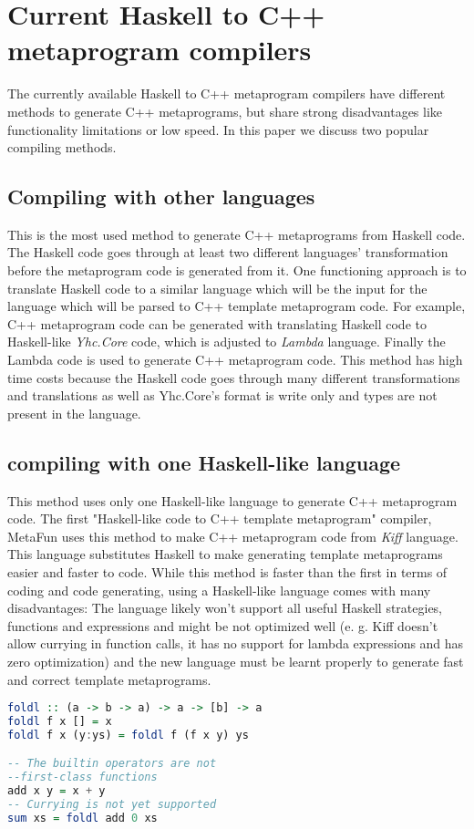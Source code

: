 \documentclass{article}
\begin{document}
\section{Current Haskell to C++ metaprogram compilers}
The currently available Haskell to C++ metaprogram compilers have different methods to generate C++ metaprograms, but share strong disadvantages like functionality limitations or low speed. In this paper we discuss two popular compiling methods.
\subsection{Compiling with other languages}
This is the most used method to generate C++ metaprograms from Haskell code. The Haskell code goes through at least two different languages' transformation before the metaprogram code is generated from it. One functioning approach is to translate Haskell code to a similar language which will be the input for the language which will be parsed to C++ template metaprogram code. For example, C++ metaprogram code can be generated with translating Haskell code to Haskell-like \textit{Yhc.Core} code, which is adjusted to \textit{Lambda} language. Finally the Lambda code is used to generate C++ metaprogram code.\cite{porkolab2009c++} This method has high time costs because the Haskell code goes through many different transformations and translations as well as Yhc.Core's format is write only and types are not present in the language.\cite{yhc}
\subsection{compiling with one Haskell-like language}
This method uses only one Haskell-like language to generate C++ metaprogram code. The first "Haskell-like code to C++ template metaprogram" compiler, MetaFun\cite{metafun} uses this method to make C++ metaprogram code from \textit{Kiff} language. This language substitutes Haskell to make generating template metaprograms easier and faster to code. While this method is faster than the first in terms of coding and code generating, using a Haskell-like language comes with many disadvantages: The language likely won't support all useful Haskell strategies, functions and expressions and might be not optimized well (e. g. Kiff doesn't allow currying in function calls, it has no support for lambda expressions and has zero optimization) and the new language must be learnt properly to generate fast and correct template metaprograms.
\begin{lstlisting}[language=Haskell, caption =Definition of sum using Kiff with comments of missing functions]
foldl :: (a -> b -> a) -> a -> [b] -> a
foldl f x [] = x
foldl f x (y:ys) = foldl f (f x y) ys

-- The builtin operators are not
--first-class functions
add x y = x + y
-- Currying is not yet supported 
sum xs = foldl add 0 xs   
\end{lstlisting}
\end{document}
